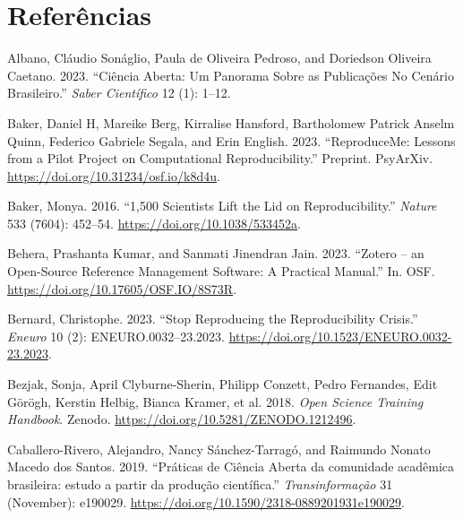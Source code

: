 \documentclass[
  a4paper,
]{article}
\newlength{\cslhangindent}
\newenvironment{CSLReferences}[2] %
 {\begin{list}{}{%
  \setlength{\itemindent}{0pt}
  \setlength{\leftmargin}{0pt}
  \setlength{\parsep}{0pt}
  \ifodd #1
   \setlength{\leftmargin}{\cslhangindent}
   \setlength{\itemindent}{-1\cslhangindent}
  \fi
  \setlength{\itemsep}{#2\baselineskip}}}
 {\end{list}}
\begin{document}

\section*{Referências}\label{referuxeancias}


\label{refs}
\begin{CSLReferences}{1}{0}
Albano, Cláudio Sonáglio, Paula de Oliveira Pedroso, and Doriedson
Oliveira Caetano. 2023. {``Ci{ê}ncia {Aberta}: {Um Panorama} Sobre as
{Publica{ç}{õ}es} No {Cen{á}rio Brasileiro}.''} \emph{Saber
Cient{í}fico} 12 (1): 1--12.

Baker, Daniel H, Mareike Berg, Kirralise Hansford, Bartholomew Patrick
Anselm Quinn, Federico Gabriele Segala, and Erin English. 2023.
{``{ReproduceMe}: Lessons from a Pilot Project on Computational
Reproducibility.''} Preprint. PsyArXiv.
\url{https://doi.org/10.31234/osf.io/k8d4u}.

Baker, Monya. 2016. {``1,500 Scientists Lift the Lid on
Reproducibility.''} \emph{Nature} 533 (7604): 452--54.
\url{https://doi.org/10.1038/533452a}.

Behera, Prashanta Kumar, and Sanmati Jinendran Jain. 2023. {``Zotero --
an Open-Source Reference Management Software: A Practical Manual.''} In.
OSF. \url{https://doi.org/10.17605/OSF.IO/8S73R}.

Bernard, Christophe. 2023. {``Stop {Reproducing} the {Reproducibility
Crisis}.''} \emph{Eneuro} 10 (2): ENEURO.0032--23.2023.
\url{https://doi.org/10.1523/ENEURO.0032-23.2023}.

Bezjak, Sonja, April Clyburne-Sherin, Philipp Conzett, Pedro Fernandes,
Edit Görögh, Kerstin Helbig, Bianca Kramer, et al. 2018. \emph{Open
{Science Training Handbook}}. Zenodo.
\url{https://doi.org/10.5281/ZENODO.1212496}.

Caballero-Rivero, Alejandro, Nancy Sánchez-Tarragó, and Raimundo Nonato
Macedo dos Santos. 2019. {``{Pr{á}ticas de Ci{ê}ncia Aberta da
comunidade acad{ê}mica brasileira: estudo a partir da produ{ç}{ã}o
cient{í}fica}.''} \emph{Transinforma{ç}{ã}o} 31 (November): e190029.
\url{https://doi.org/10.1590/2318-0889201931e190029}.


\end{CSLReferences}
\end{document}
